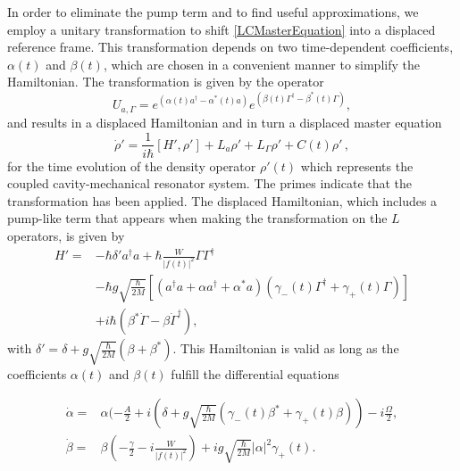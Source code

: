 \documentclass[reprint, amsmath,amssymb, aps,pra]{revtex4-1}
\begin{document}
In order to eliminate the pump term and to find useful
  approximations, we employ a unitary transformation to
shift \eqref{LCMasterEquation} into a displaced reference frame. This
transformation depends on two time-dependent coefficients, $\alpha(t)$
and $\beta(t)$, which are chosen in a convenient manner to simplify
the Hamiltonian. The transformation is given by the operator
\begin{equation}\label{ShiftTransform}
U_{a,\Gamma} = e^{(\alpha(t) a^\dagger - \alpha^*(t)a)}e^{(\beta(t) \Gamma^\dagger - \beta^*(t)\Gamma)},
\end{equation}
and results in a displaced Hamiltonian and in turn a displaced master
equation
\begin{equation}
\dot{\rho}' = \frac{1}{i\hbar}[H',\rho'] +L_a\rho' + L_\Gamma \rho' + C(t)\rho'\, ,
\end{equation}
for the time evolution of the density operator $\rho'(t)$ which
represents the coupled cavity-mechanical resonator system. The primes
indicate that the transformation has been applied. The displaced
Hamiltonian, which includes a pump-like term that appears when making the
transformation on the $L$ operators, is given by
\begin{align*}
  H'=& -\hbar \delta' a^\dagger a + \hbar\frac{W}{|f(t)|^2}\Gamma \Gamma^\dagger\\
     &-\hbar g\sqrt{\frac{\hbar}{2M}}[(a^{\dagger}a +\alpha a^{\dagger}+\alpha^* a)(\gamma_-(t)\Gamma^{\dagger}+\gamma_+(t)\Gamma)]\\
     &+ i\hbar(\beta^*\dot{\Gamma} - \beta \dot{\Gamma}^\dagger),
\end{align*}
with $\delta' = \delta + g\sqrt{\frac{\hbar}{2M}}(\beta + \beta^*)$.
This Hamiltonian is valid as long as the coefficients $\alpha(t)$ and
$\beta(t)$ fulfill the differential equations

\begin{align}
\dot{\alpha} =& \alpha(-\frac{A}{2}+i(\delta+g\sqrt{\frac{\hbar}{2M}}(\gamma_-(t) \beta^* + \gamma_+(t) \beta))-i\frac{\Omega}{2},\\
\dot{\beta} =& \beta(-\frac{\gamma}{2}-i\frac{W}{|f(t)|^2})+ig\sqrt{\frac{\hbar}{2M}}|\alpha|^2\gamma_+(t).
\end{align}
\end{document}
